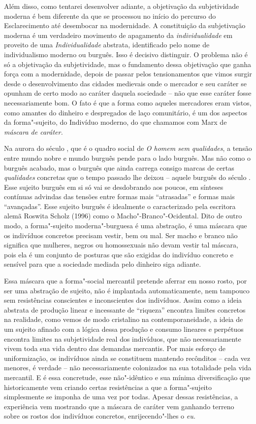 Além disso, como tentarei desenvolver adiante, a objetivação da
subjetividade moderna é bem diferente da que se processou no início do
percurso do Esclarecimento até desembocar na modernidade. A constituição
da subjetivação moderna é um verdadeiro movimento de apagamento da
\emph{individualidade} em proveito de uma \emph{Individualidade}
abstrata, identificado pelo nome de individualismo moderno ou burguês.
Isso é decisivo distinguir. O problema não é só a objetivação da
subjetividade, mas o fundamento dessa objetivação que ganha força com a
modernidade, depois de passar pelos tensionamentos que vimos surgir
desde o desenvolvimento das cidades medievais onde o mercador e seu
caráter se opunham de certo modo ao caráter daquela sociedade -- não que
esse caráter fosse necessariamente bom. O fato é que a forma como
aqueles mercadores eram vistos, como amantes do dinheiro e despregados
de laço comunitário, é um dos aspectos da forma"-sujeito, do Indivíduo
moderno, do que chamamos com Marx de \emph{máscara de caráter.}

Na aurora do século , que é o quadro social de \emph{O homem sem
qualidades}, a tensão entre mundo nobre e mundo burguês pende para o
lado burguês. Mas não como o burguês acabado, mas o burguês que ainda
carrega consigo marcas de certas \emph{qualidades} concretas que o tempo
passado lhe deixou -- aquele burguês do século . Esse sujeito burguês
em si só vai se desdobrando aos poucos, em sínteses contínuas advindas
das tensões entre formas mais ``atrasadas'' e formas mais ``avançadas''.
Esse sujeito burguês é idealmente o caracterizado pela escritora alemã
Roswita Scholz (1996) como o Macho"-Branco"-Ocidental. Dito de outro modo,
a forma"-sujeito moderna"-burguesa é uma abstração, é uma máscara que os
indivíduos concretos precisam vestir, bem ou mal. Ser macho e branco não
significa que mulheres, negros ou homossexuais não devam vestir tal
máscara, pois ela é um conjunto de posturas que são exigidas do
indivíduo concreto e sensível para que a sociedade mediada pelo dinheiro
siga adiante.

Essa máscara que a forma"-social mercantil pretende aferrar em nosso
rosto, por ser uma abstração de sujeito, não é implantada
automaticamente, nem tampouco sem resistências conscientes e
inconscientes dos indivíduos. Assim como a ideia abstrata de produção
linear e incessante de ``riqueza'' encontra limites concretos na
realidade, como vemos de modo cristalino na contemporaneidade, a ideia
de um sujeito afinado com a lógica dessa produção e consumo lineares e
perpétuos encontra limites na subjetividade real dos indivíduos, que não
necessariamente vivem toda sua vida dentro das demandas mercantis. Por
mais esforço de uniformização, os indivíduos ainda se constituem
mantendo recônditos -- cada vez menores, é verdade -- não
necessariamente colonizados na sua totalidade pela vida mercantil. E é
essa concretude, esse não"-idêntico e sua mínima diversificação que
historicamente vem criando certas resistências a que a forma"-sujeito
simplesmente se imponha de uma vez por todas. Apesar dessas
resistências, a experiência vem mostrando que a máscara de caráter vem
ganhando terreno sobre os rostos dos indivíduos concretos,
enrijecendo"-lhes o \emph{eu.}


